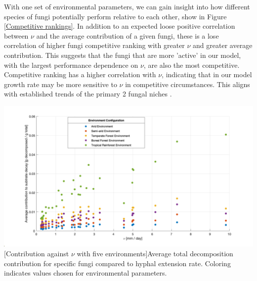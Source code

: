 \documentclass[12pt]{article}
\begin{document}
\begin{multicols}{2}
With one set of environmental parameters, we can gain insight into how different species of fungi potentially perform relative to each other, show in Figure \ref{Competitive rankings}. In addition to an expected loose positive correlation between $\nu$ and the average contribution of a given fungi, these is a lose correlation of higher fungi competitive ranking with greater $\nu$ and greater average contribution. This suggests that the fungi that are more 'active' in our model, with the largest performance dependence on $\nu$, are also the most competitive. Competitive ranking has a higher correlation with $\nu$, indicating that in our model growth rate may be more sensitive to $\nu$ in competitive circumstances. This aligns with established trends of the primary 2 fungal niches \cite{Maynard2019}.

\end{multicols}
\begin{center}\label{Environment Contributions}
\includegraphics[width=\linewidth]{avg_contr_nu_environment.png}
[Contribution against $\nu$ with five environments]{Average total decomposition contribution for specific fungi compared to hyphal extension rate. Coloring indicates values chosen for environmental parameters.}
\label{Fig 4.}
\end{center}
\end{document}
